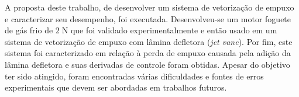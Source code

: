 A proposta deste trabalho, de desenvolver um sistema de vetorização de empuxo e caracterizar seu desempenho, foi executada. Desenvolveu-se um motor foguete de gás frio de \(2\;\mathrm{N} \) que foi validado experimentalmente e então usado em um sistema de vetorização de empuxo com lâmina defletora (\textit{jet vane}). Por fim, este sistema foi caracterizado em relação à perda de empuxo causada pela adição da lâmina defletora e suas derivadas de controle foram obtidas. Apesar do objetivo ter sido atingido, foram encontradas várias dificuldades e fontes de erros experimentais que devem ser abordadas em trabalhos futuros.